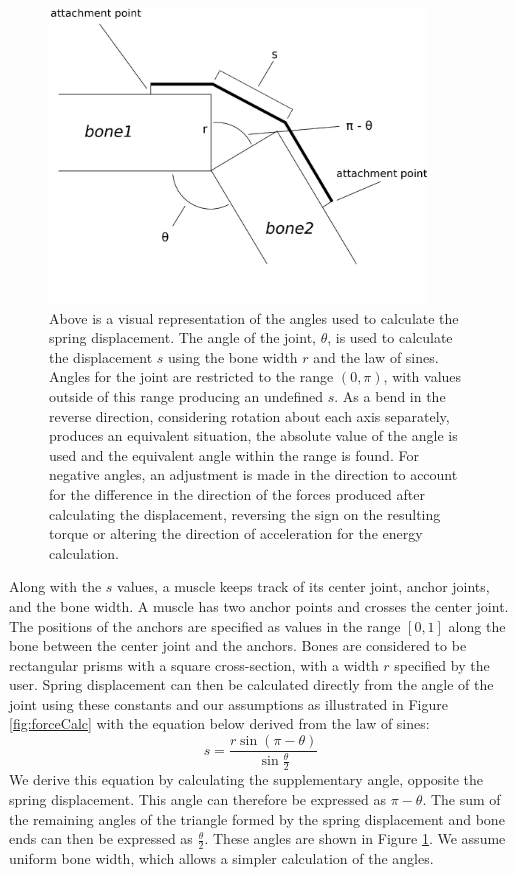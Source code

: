 \begin{figure}[ht]
	\centering
	\includegraphics[width=10cm]{images/spring_calc/angle_diag.eps}
	\caption[Diagram of spring displacement calculation]{Above is a visual representation of the angles used to calculate the spring displacement.  The angle of the joint, $\theta$, is used to calculate the displacement $s$ using the bone width $r$ and the law of sines.  Angles for the joint are restricted to the range $(0, \pi)$, with values outside of this range producing an undefined $s$.  As a bend in the reverse direction, considering rotation about each axis separately, produces an equivalent situation, the absolute value of the angle is used and the equivalent angle within the range is found.  For negative angles, an adjustment is made in the direction to account for the difference in the direction of the forces produced after calculating the displacement, reversing the sign on the resulting torque or altering the direction of acceleration for the energy calculation.}
	\label{fig:angleDiag}
\end{figure}

Along with the $s$ values, a muscle keeps track of its center joint, anchor joints, and the bone width.  A muscle has two anchor points and crosses the center joint.  The positions of the anchors are specified as values in the range $[0,1]$ along the bone between the center joint and the anchors.  Bones are considered to be rectangular prisms with a square cross-section, with a width $r$ specified by the user.  Spring displacement can then be calculated directly from the angle of the joint using these constants and our assumptions as illustrated in Figure \ref{fig:forceCalc} with the equation below derived from the law of sines:
\[ 
	s = \dfrac{r\sin\left(\pi - \theta \right)}{\sin\frac{\theta}{2}}
\]
We derive this equation by calculating the supplementary angle, opposite the spring displacement.  This angle can therefore be expressed as $\pi - \theta$. The sum of the remaining angles of the triangle formed by the spring displacement and bone ends can then be expressed as $\frac{\theta}{2}$.  These angles are shown in Figure \ref{fig:angleDiag}. We assume uniform bone width, which allows a simpler calculation of the angles.

